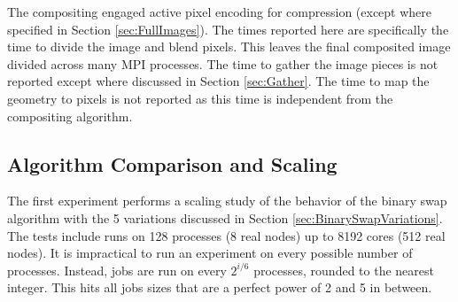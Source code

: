 \documentclass{vgtc}                          %
\newcommand{\textalgorithm}[1]{\textsf{#1}\xspace}
\newcommand{\binaryswap}{\textalgorithm{binary swap}}
\begin{document}
The compositing engaged active pixel encoding for compression (except where specified in Section \ref{sec:FullImages}).
The times reported here are specifically the time to divide the image and blend pixels.
This leaves the final composited image divided across many MPI processes.
The time to gather the image pieces is not reported except where discussed in Section \ref{sec:Gather}.
The time to map the geometry to pixels is not reported as this time is independent from the compositing algorithm.

\subsection{Algorithm Comparison and Scaling}
\label{sec:Scaling}

The first experiment performs a scaling study of the behavior of the \binaryswap algorithm with the 5 variations discussed in Section \ref{sec:BinarySwapVariations}.
The tests include runs on 128 processes (8 real nodes) up to 8192 cores (512 real nodes).
It is impractical to run an experiment on every possible number of processes.
Instead, jobs are run on every $2^{i/6}$ processes, rounded to the nearest integer.
This hits all jobs sizes that are a perfect power of 2 and 5 in between.
\end{document}

